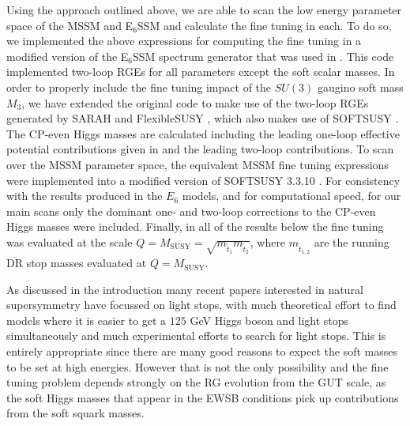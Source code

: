 \documentclass[preprint,amsmath,amssymb,aps,superscriptaddress,prd,showpacs,floatfix,nofootinbib]{revtex4-1}
\begin{document}
Using the approach outlined above, we are able to scan the low energy
parameter space of the MSSM and E$_6$SSM and calculate the fine tuning
in each. To do so, we implemented the above expressions for computing
the fine tuning in a modified version of the E$_6$SSM spectrum
generator that was used in \cite{Athron:2013ipa}. This code
implemented two-loop RGEs for all parameters except the soft scalar
masses. In order to properly include the fine tuning impact of the
$SU(3)$ gaugino soft mass $M_3$, we have extended the original code to
make use of the two-loop RGEs generated by SARAH
\cite{Staub:2009bi,Staub:2010jh,Staub:2012pb,Staub:2013tta} and
FlexibleSUSY \cite{Athron:2014yba}, which also makes use of SOFTSUSY \cite{Allanach:2001kg,Allanach:2013kza}. The CP-even Higgs masses are
calculated including the leading one-loop effective potential
contributions given in \cite{Athron:2009bs} and the leading two-loop
contributions. To scan over the MSSM parameter space, the equivalent
MSSM fine tuning expressions were implemented into a modified version
of SOFTSUSY 3.3.10 \cite{Allanach:2001kg}. For
consistency with the results produced in the $E_6$ models, and for
computational speed, for our main scans only the dominant one- and
two-loop corrections to the CP-even Higgs masses were
included. Finally, in all of the results below the fine tuning was
evaluated at the scale
$Q=M_{\textrm{SUSY}}=\sqrt{m_{\tilde{t}_1}m_{\tilde{t}_2}}$, where
$m_{\tilde{t}_{1,2}}$ are the running $\overline{\textrm{DR}}$ stop
masses evaluated at $Q=M_{\textrm{SUSY}}$.


As discussed in the introduction many recent papers interested in
natural supersymmetry have focussed on light stops, with much
theoretical effort to find models where it is easier to get a $125$
GeV Higgs boson and light stops simultaneously and much experimental
efforts to search for light stops.  This is entirely appropriate since
there are many good reasons to expect the soft masses to be set at
high energies.  However that is not the only possibility and the fine
tuning problem depends strongly on the RG evolution from the GUT
scale, as the soft Higgs masses that appear in the EWSB conditions
pick up contributions from the soft squark masses.
\end{document}
